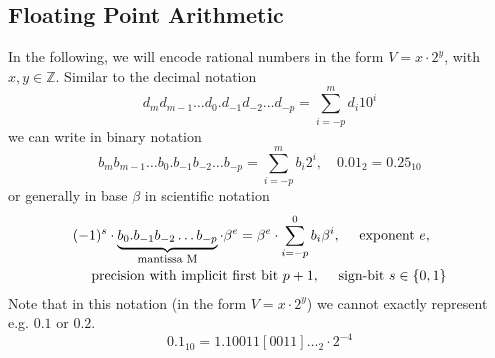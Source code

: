 \subsection{Floating Point Arithmetic}
In the following, we will encode rational numbers in the form $V = x \cdot 2^y$, with $x,y \in \mathbb{Z}$. Similar to the decimal notation
\begin{equation}
    d_m d_{m-1} \dots d_0 . d_{-1} d_{-2} \dots d_{-p} = \sum_{i=-p}^m d_i 10^i
\end{equation}
we can write in binary notation
\begin{equation}
    b_m b_{m-1} \dots b_0 . b_{-1} b_{-2} \dots b_{-p} = \sum_{i=-p}^m b_i 2^i, \quad 0.01_2 = 0.25_{10}
\end{equation}
or generally in base $\beta$ in scientific notation
\begin{equation}
    \begin{multlined}
        (-1) ^ s \cdot \explain{b_0 . b_{-1} b_{-2} \dots b_{-p}}{mantissa M} \cdot \beta^e = \beta^e \cdot \sum_{i=-p}^0 b_i \beta^i, \quad \text{ exponent } e,\\ \text{ precision with implicit first bit } p+1, \quad \text{ sign-bit } s \in \{0,1\}
    \end{multlined}
\end{equation}
Note that in this notation (in the form $V = x \cdot 2^y$) we cannot exactly represent e.g. $0.1$ or $0.2$.
\begin{equation}
    0.1_{10} = 1.10011[0011]\dots_2 \cdot 2^{-4}
\end{equation}

